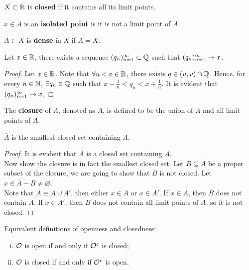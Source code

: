 \documentclass[11pt]{article}
\begin{document}
	\begin{definition}
		$X \subset \mathbb{R}$ is \textbf{closed} if it contains all its limit points.
	\end{definition}
	
	\begin{definition}
		$x \in A$ is an \textbf{isolated point} is it is not a limit point of $A$.
	\end{definition}
	
	\begin{definition}
		$A \subset X$ is \textbf{dense} in $X$ if $\overline{A} = X$.
	\end{definition}
	
	\begin{theorem}
		Let $x \in \mathbb{R}$, there exists a sequence $({q}_{n})_{{n}=1}^\infty \subset \mathbb{Q}$ such that $({q}_{n})_{{n}=1}^\infty \to x$.
	\end{theorem}
	
	\begin{proof}
		Let $x \in \mathbb{R}$. Note that $\forall u < v \in \mathbb{R}$, there exists $q \in (u, v) \cap \mathbb{Q}$.
		Hence, for every $n \in \mathbb{N}$, $\exists q_n \in \mathbb{Q}$ such that $x - \frac{1}{n} < q_n < x + \frac{1}{n}$. It is evident that $({q}_{n})_{{n}=1}^\infty \to x$.
	\end{proof}
	
	\begin{definition}
		The \textbf{closure} of $A$, denoted as $\overline{A}$, is defined to be the union of $A$ and all limit points of $A$.
	\end{definition}
	
	\begin{lemma}
		$\overline{A}$ is the smallest closed set containing $A$.
	\end{lemma}
	\begin{proof}
		It is evident that $\overline{A}$ is a closed set containing $A$. \\
		Now show the closure is in fact the smallest closed set. Let $B \subsetneq \overline{A}$ be a proper subset of the closure, we are going to show that $B$ is not closed. Let $x \in \overline{A} - B \neq \varnothing$.\\
		Note that $\overline{A} \equiv A \cup A'$, then either $x \in A$ or $x \in A'$. If $x \in A$, then $B$ does not contain $A$. If $x \in A'$, then $B$ does not contain all limit points of $A$, so it is not closed.
	\end{proof}
	
	\begin{theorem} Equivalent definitions of openness and closedness:
		\begin{enumerate}[(i)]
			\item $\mathcal{{O}}$ is open if and only if $\mathcal{{O}}^c$ is closed;
			\item $\mathcal{{O}}$ is closed if and only if $\mathcal{{O}}^c$ is open.
		\end{enumerate}
	\end{theorem}
	
\end{document}
